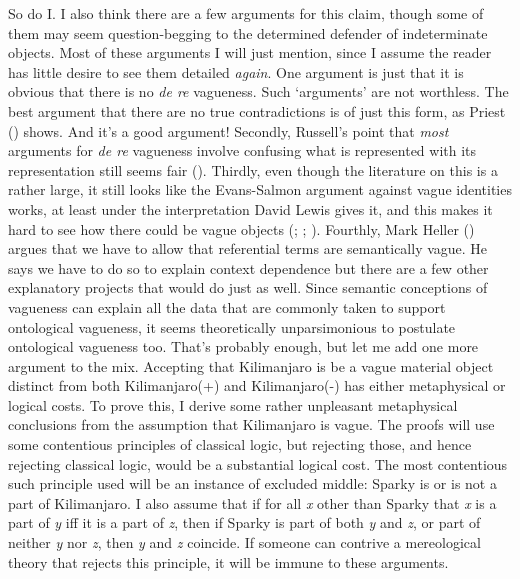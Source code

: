 \documentclass[
  10pt,
  letterpaper,
  DIV=11,
  numbers=noendperiod,
  twoside]{scrartcl}
\begin{document}
So do I. I also think there are a few arguments for this claim, though
some of them may seem question-begging to the determined defender of
indeterminate objects. Most of these arguments I will just mention,
since I assume the reader has little desire to see them detailed
\emph{again}. One argument is just that it is obvious that there is no
\emph{de re} vagueness. Such `arguments' are not worthless. The best
argument that there are no true contradictions is of just this form, as
Priest () shows. And it's a good
argument! Secondly, Russell's point that \emph{most} arguments for
\emph{de re} vagueness involve confusing what is represented with its
representation still seems fair (). Thirdly, even though the literature on this is a rather large,
it still looks like the Evans-Salmon argument against vague identities
works, at least under the interpretation David Lewis gives it, and this
makes it hard to see how there could be vague objects
(; ; ). Fourthly, Mark Heller
() argues that we have to allow that
referential terms are semantically vague. He says we have to do so to
explain context dependence but there are a few other explanatory
projects that would do just as well. Since semantic conceptions of
vagueness can explain all the data that are commonly taken to support
ontological vagueness, it seems theoretically unparsimonious to
postulate ontological vagueness too. That's probably enough, but let me
add one more argument to the mix. Accepting that Kilimanjaro is be a
vague material object distinct from both Kilimanjaro(+) and
Kilimanjaro(-) has either metaphysical or logical costs. To prove this,
I derive some rather unpleasant metaphysical conclusions from the
assumption that Kilimanjaro is vague. The proofs will use some
contentious principles of classical logic, but rejecting those, and
hence rejecting classical logic, would be a substantial logical cost.
The most contentious such principle used will be an instance of excluded
middle: Sparky is or is not a part of Kilimanjaro. I also assume that if
for all \emph{x} other than Sparky that \emph{x} is a part of \emph{y}
iff it is a part of \emph{z}, then if Sparky is part of both \emph{y}
and \emph{z}, or part of neither \emph{y} nor \emph{z}, then \emph{y}
and \emph{z} coincide. If someone can contrive a mereological theory
that rejects this principle, it will be immune to these arguments.
\end{document}
